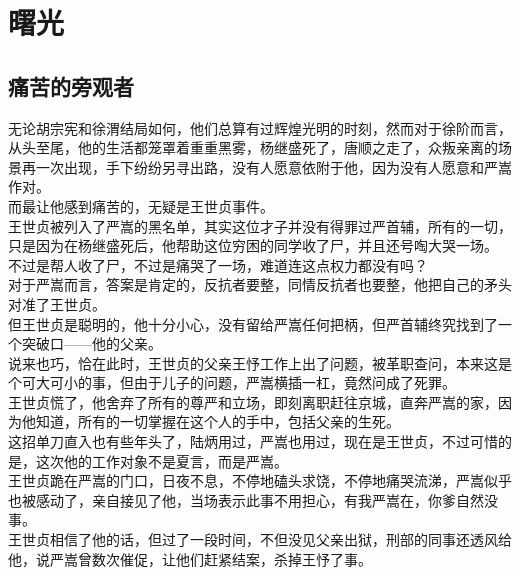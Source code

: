 \section{曙光}
\ifnum{}
	\begin{multicols}{\theparacolNo}
\fi
\subsection{痛苦的旁观者}
无论胡宗宪和徐渭结局如何，他们总算有过辉煌光明的时刻，然而对于徐阶而言，从头至尾，他的生活都笼罩着重重黑雾，杨继盛死了，唐顺之走了，众叛亲离的场景再一次出现，手下纷纷另寻出路，没有人愿意依附于他，因为没有人愿意和严嵩作对。\\

而最让他感到痛苦的，无疑是王世贞事件。\\

王世贞被列入了严嵩的黑名单，其实这位才子并没有得罪过严首辅，所有的一切，只是因为在杨继盛死后，他帮助这位穷困的同学收了尸，并且还号啕大哭一场。\\

不过是帮人收了尸，不过是痛哭了一场，难道连这点权力都没有吗？\\

对于严嵩而言，答案是肯定的，反抗者要整，同情反抗者也要整，他把自己的矛头对准了王世贞。\\

但王世贞是聪明的，他十分小心，没有留给严嵩任何把柄，但严首辅终究找到了一个突破口——他的父亲。\\

说来也巧，恰在此时，王世贞的父亲王忬工作上出了问题，被革职查问，本来这是个可大可小的事，但由于儿子的问题，严嵩横插一杠，竟然问成了死罪。\\

王世贞慌了，他舍弃了所有的尊严和立场，即刻离职赶往京城，直奔严嵩的家，因为他知道，所有的一切掌握在这个人的手中，包括父亲的生死。\\

这招单刀直入也有些年头了，陆炳用过，严嵩也用过，现在是王世贞，不过可惜的是，这次他的工作对象不是夏言，而是严嵩。\\

王世贞跪在严嵩的门口，日夜不息，不停地磕头求饶，不停地痛哭流涕，严嵩似乎也被感动了，亲自接见了他，当场表示此事不用担心，有我严嵩在，你爹自然没事。\\

王世贞相信了他的话，但过了一段时间，不但没见父亲出狱，刑部的同事还透风给他，说严嵩曾数次催促，让他们赶紧结案，杀掉王忬了事。\\


\end{multicols}
